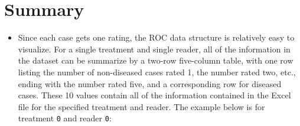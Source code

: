 \documentclass[]{book}
\newenvironment{Shaded}{\begin{snugshade}}{\end{snugshade}}
\newcommand{\CommentTok}[1]{\textcolor[rgb]{0.56,0.35,0.01}{\textit{#1}}}
\newcommand{\ControlFlowTok}[1]{\textcolor[rgb]{0.13,0.29,0.53}{\textbf{#1}}}
\newcommand{\DecValTok}[1]{\textcolor[rgb]{0.00,0.00,0.81}{#1}}
\newcommand{\KeywordTok}[1]{\textcolor[rgb]{0.13,0.29,0.53}{\textbf{#1}}}
\newcommand{\NormalTok}[1]{#1}
\newcommand{\OperatorTok}[1]{\textcolor[rgb]{0.81,0.36,0.00}{\textbf{#1}}}
\newcommand{\StringTok}[1]{\textcolor[rgb]{0.31,0.60,0.02}{#1}}
\providecommand{\tightlist}{%
  \setlength{\itemsep}{0pt}\setlength{\parskip}{0pt}}
\begin{document}
\hypertarget{summary}{%
\section{Summary}\label{summary}}

\begin{itemize}
\tightlist
\item
  Since each case gets one rating, the ROC data structure is relatively easy to visualize. For a single treatment and single reader, all of the information in the dataset can be summarize by a two-row five-column table, with one row listing the number of non-diseased cases rated 1, the number rated two, etc., ending with the number rated five, and a corresponding row for diseased cases. These 10 values contain all of the information contained in the Excel file for the specified treatment and reader. The example below is for treatment \texttt{0} and reader \texttt{0}:
\end{itemize}

\begin{Shaded}
\end{Shaded}
\end{document}
